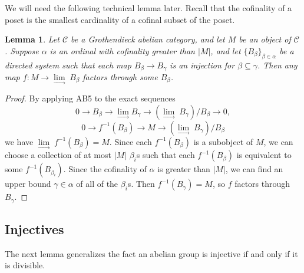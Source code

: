 \documentclass[letterpaper,11pt]{article}
\newtheorem{lem}{Lemma}
\theoremstyle{definition}
\theoremstyle{remark}
\begin{document}
We will need the following technical lemma later. Recall that the cofinality of a poset is the smallest cardinality of a cofinal subset of the poset.

\begin{lem}\label{alpha-small} Let $\mathcal{C}$ be a Grothendieck abelian category, and let $M$ be an object of $\mathcal{C}$. Suppose $\alpha$ is an ordinal with cofinality greater than $|M|$, and let $\{B_\beta\}_{\beta \in \alpha}$ be a directed system such that each map $B_\beta\rightarrow B_\gamma$ is an injection for $\beta\subseteq\gamma$. Then any map $f:M\rightarrow \underset{\longrightarrow}{\lim}\;B_\beta$ factors through some $B_\beta$.
\end{lem}
\begin{proof} By applying AB5 to the exact sequences
\[
0\rightarrow B_\beta \rightarrow \underset{\longrightarrow}{\lim}B_\gamma \rightarrow (\underset{\longrightarrow}{\lim}\;B_\gamma)/B_\beta \rightarrow 0,
\]
\[
0\rightarrow f^{-1}(B_\beta) \rightarrow M \rightarrow (\underset{\longrightarrow}{\lim}\;B_\gamma)/B_\beta
\]
we have $\underset{\longrightarrow}{\lim}\;f^{-1}(B_\beta) = M$. Since each $f^{-1}(B_{\beta})$ is a subobject of $M$, we can choose a collection of at most $|M|$ $\beta_i$s such that each $f^{-1}(B_\beta)$ is equivalent to some $f^{-1}(B_{\beta_i})$. Since the cofinality of $\alpha$ is greater than $|M|$, we can find an upper bound $\gamma\in\alpha$ of all of the $\beta_i$s. Then $f^{-1}(B_\gamma) = M$, so $f$ factors through $B_\gamma$.
\end{proof}

\subsection{Injectives}

The next lemma generalizes the fact an abelian group is injective if and only if it is divisible.
\end{document}

